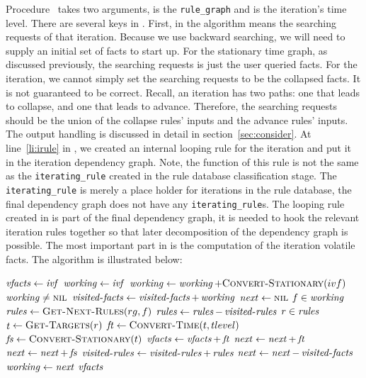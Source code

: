 \documentclass{article}
\begin{document}
Procedure~ takes two arguments,  is the
\texttt{rule\_graph} and  is the iteration's time level.
There are several keys in . First,  in the
algorithm means the searching requests of that iteration. Because we
use backward searching, we will need to supply an initial set of facts
to start up. For the stationary time graph, as discussed previously,
the searching requests is just the user queried facts. For the
iteration, we cannot simply set the searching requests to be the
collapsed facts. It is not guaranteed to be correct. Recall, an
iteration has two paths: one that leads to collapse, and one that
leads to advance. Therefore, the searching requests should be the
union of the collapse rules' inputs and the advance rules' inputs. The
output handling is discussed in detail in
section~\ref{sec:consider}. At line~\ref{li:irule} in
, we created an internal looping rule for the
iteration and put it in the iteration dependency graph. Note, the
function of this rule is not the same as the \texttt{iterating\_rule}
created in the rule database classification stage. The
\texttt{iterating\_rule} is merely a place holder for iterations in
the rule database, the final dependency graph does not have any
\texttt{iterating\_rule}s. The looping rule created in
 is part of the final dependency graph, it is needed
to hook the relevant iteration rules together so that later
decomposition of the dependency graph is possible. The most important
part in  is the computation of the iteration volatile
facts. The algorithm is illustrated below:

\begin{codebox}
\li $\id{vfacts} \gets \id{ivf}$
\li $\id{working} \gets \id{ivf}$
\li $\id{working} \gets \id{working} +
    \proc{Convert-Stationary}(ivf)$\label{li:add-init-stationary} 
\li \While $\id{working} \ne \const{nil}$
\li   \Do
         $\id{visited-facts} \gets \id{visited-facts} + \id{working}$
\li      $\id{next} \gets \const{nil}$
\li      \For $f \in \id{working}$
\li        \Do
              $\id{rules} \gets \proc{Get-Next-Rules}(rg,f)$
\li           $\id{rules} \gets \id{rules} - \id{visited-rules}$
\li           \For $r \in \id{rules}$
\li             \Do
                   $\id{t} \gets \proc{Get-Targets}(r)$
\li                $\id{ft} \gets \proc{Convert-Time}(t,tlevel)$
                                  \label{li:convert-time} 
\li                $\id{fs} \gets \proc{Convert-Stationary}(t)$
                                  \label{li:convert-stationary} 
\li                $\id{vfacts} \gets \id{vfacts} + \id{ft}$
\li                $\id{next} \gets \id{next} + \id{ft}$
\li                $\id{next} \gets \id{next} + \id{fs}$
              \End
\li           $\id{visited-rules} \gets \id{visited-rules} + \id{rules}$
         \End
\li      $\id{next} \gets \id{next} - \id{visited-facts}$
\li      $\id{working} \gets \id{next}$
    \End
\li \Return $\id{vfacts}$
\end{codebox}
\end{document}
